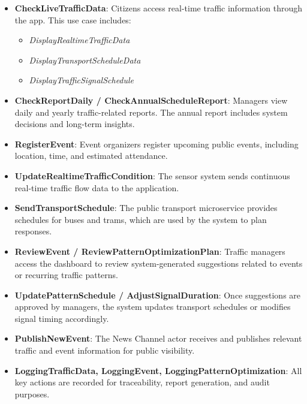 \begin{itemize}
    \item \textbf{CheckLiveTrafficData}: Citizens access real-time traffic information through the app. This use case includes:
    \begin{itemize}
        \item \textit{DisplayRealtimeTrafficData}
        \item \textit{DisplayTransportScheduleData}
        \item \textit{DisplayTrafficSignalSchedule}
    \end{itemize}

    \item \textbf{CheckReportDaily / CheckAnnualScheduleReport}: Managers view daily and yearly traffic-related reports. The annual report includes system decisions and long-term insights.

    \item \textbf{RegisterEvent}: Event organizers register upcoming public events, including location, time, and estimated attendance.

    \item \textbf{UpdateRealtimeTrafficCondition}: The sensor system sends continuous real-time traffic flow data to the application.

    \item \textbf{SendTransportSchedule}: The public transport microservice provides schedules for buses and trams, which are used by the system to plan responses.

    \item \textbf{ReviewEvent / ReviewPatternOptimizationPlan}: Traffic managers access the dashboard to review system-generated suggestions related to events or recurring traffic patterns.

    \item \textbf{UpdatePatternSchedule / AdjustSignalDuration}: Once suggestions are approved by managers, the system updates transport schedules or modifies signal timing accordingly.

    \item \textbf{PublishNewEvent}: The News Channel actor receives and publishes relevant traffic and event information for public visibility.

    \item \textbf{LoggingTrafficData, LoggingEvent, LoggingPatternOptimization}: All key actions are recorded for traceability, report generation, and audit purposes.
\end{itemize}

